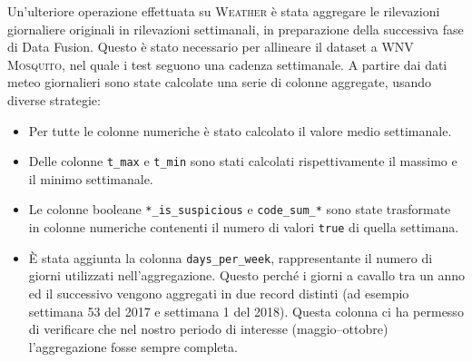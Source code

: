 Un'ulteriore operazione effettuata su \textsc{Weather} è stata aggregare le 
rilevazioni giornaliere originali in rilevazioni settimanali, in preparazione 
della successiva fase di Data Fusion. Questo è stato necessario per allineare 
il dataset a \textsc{WNV Mosquito}, nel quale i test seguono una cadenza 
settimanale. A partire dai dati meteo giornalieri sono state calcolate una 
serie di colonne aggregate, usando diverse strategie:
\begin{itemize}
	\item Per tutte le colonne numeriche è stato calcolato il valore medio 
	settimanale.
	\item Delle colonne \texttt{t\_max} e \texttt{t\_min} sono stati calcolati 
	rispettivamente il massimo e il minimo settimanale.
	\item Le colonne booleane \texttt{*\_is\_suspicious} e 
	\texttt{code\_sum\_*} sono state trasformate in colonne numeriche 
	contenenti il numero di valori \texttt{true} di quella settimana.
	\item È stata aggiunta la colonna \texttt{days\_per\_week}, rappresentante 
	il numero di giorni utilizzati nell'aggregazione. Questo perché i giorni a 
	cavallo tra un anno ed il successivo vengono aggregati in due record 
	distinti (ad esempio settimana 53 del 2017 e settimana 1 del 2018). Questa 
	colonna ci ha permesso di verificare che nel nostro periodo di interesse 
	(maggio--ottobre) l'aggregazione fosse sempre completa.
\end{itemize}
